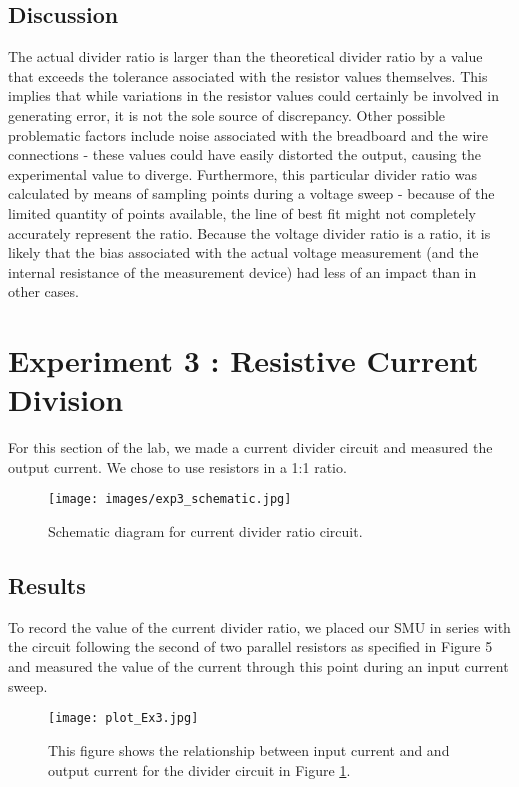 \documentclass{article}
\begin{document}
\subsection{Discussion}
The actual divider ratio is larger than the theoretical divider ratio by a value that exceeds the tolerance associated with the resistor values themselves. This implies that while variations in the resistor values could certainly be involved in generating error, it is not the sole source of discrepancy. Other possible problematic factors include noise associated with the breadboard and the wire connections - these values could have easily distorted the output, causing the experimental value to diverge. Furthermore, this particular divider ratio was calculated by means of sampling points during a voltage sweep - because of the limited quantity of points available, the line of best fit might not completely accurately represent the ratio. Because the voltage divider ratio is a ratio, it is likely that the bias associated with the actual voltage measurement (and the internal resistance of the measurement device) had less of an impact than in other cases. 

\section{Experiment 3 : Resistive Current Division}

For this section of the lab, we made a current divider circuit and measured the output current. We chose to use resistors in a 1:1 ratio. 
\begin{figure}[H]
    \centering
    \texttt{[image: images/exp3\_schematic.jpg]}
    \caption{Schematic diagram for current divider ratio circuit.}
    \label{fig:exp3}
\end{figure}


\subsection{Results}
To record the value of the current divider ratio, we placed our SMU in series with the circuit following the second of two parallel resistors as specified in Figure 5 and measured the value of the current through this point during an input current sweep.
\begin{figure}[H]
    \centering
    \texttt{[image: plot\_Ex3.jpg]}
    \caption{This figure shows the relationship between input current and and output current for the divider circuit in Figure \ref{fig:exp3}.}
    \label{fig:ramp}
\end{figure}
\end{document}
